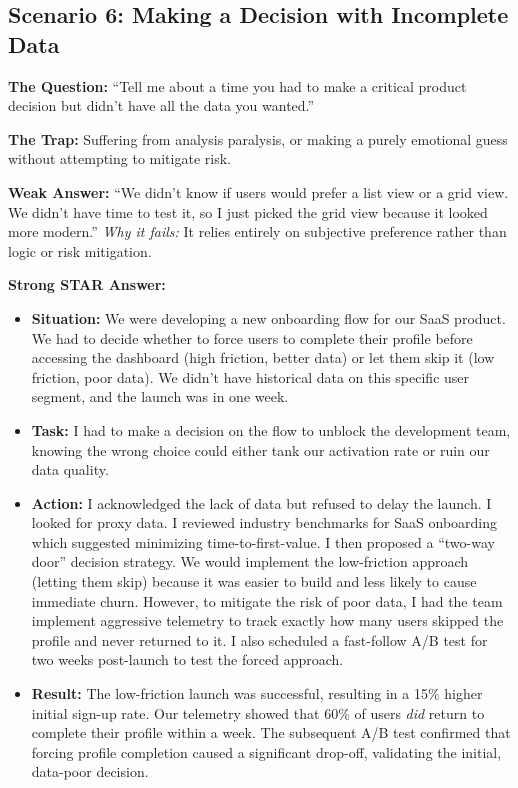 \documentclass[
  11pt,
  openany,
  oneside]{book}
\providecommand{\tightlist}{%
  \setlength{\itemsep}{0pt}\setlength{\parskip}{0pt}}
\begin{document}
\subsection{Scenario 6: Making a Decision with Incomplete
Data}\label{scenario-6-making-a-decision-with-incomplete-data}

\textbf{The Question:} ``Tell me about a time you had to make a critical
product decision but didn't have all the data you wanted.''

\textbf{The Trap:} Suffering from analysis paralysis, or making a purely
emotional guess without attempting to mitigate risk.

\textbf{Weak Answer:} ``We didn't know if users would prefer a list view
or a grid view. We didn't have time to test it, so I just picked the
grid view because it looked more modern.'' \emph{Why it fails:} It
relies entirely on subjective preference rather than logic or risk
mitigation.

\textbf{Strong STAR Answer:}

\begin{itemize}
\tightlist
\item
  \textbf{Situation:} We were developing a new onboarding flow for our
  SaaS product. We had to decide whether to force users to complete
  their profile before accessing the dashboard (high friction, better
  data) or let them skip it (low friction, poor data). We didn't have
  historical data on this specific user segment, and the launch was in
  one week.
\item
  \textbf{Task:} I had to make a decision on the flow to unblock the
  development team, knowing the wrong choice could either tank our
  activation rate or ruin our data quality.
\item
  \textbf{Action:} I acknowledged the lack of data but refused to delay
  the launch. I looked for proxy data. I reviewed industry benchmarks
  for SaaS onboarding which suggested minimizing time-to-first-value. I
  then proposed a ``two-way door'' decision strategy. We would implement
  the low-friction approach (letting them skip) because it was easier to
  build and less likely to cause immediate churn. However, to mitigate
  the risk of poor data, I had the team implement aggressive telemetry
  to track exactly how many users skipped the profile and never returned
  to it. I also scheduled a fast-follow A/B test for two weeks
  post-launch to test the forced approach.
\item
  \textbf{Result:} The low-friction launch was successful, resulting in
  a 15\% higher initial sign-up rate. Our telemetry showed that 60\% of
  users \emph{did} return to complete their profile within a week. The
  subsequent A/B test confirmed that forcing profile completion caused a
  significant drop-off, validating the initial, data-poor decision.
\end{itemize}
\end{document}
